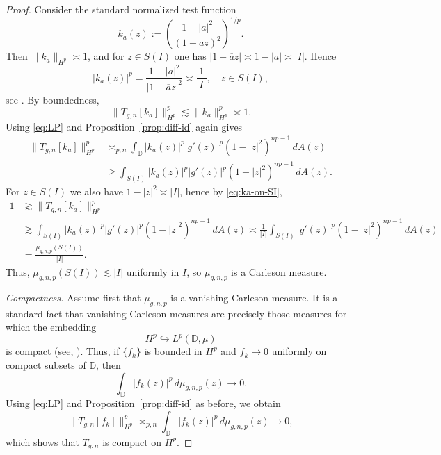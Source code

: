 \documentclass[preprint,12pt]{elsarticle}
\numberwithin{equation}{section}
\theoremstyle{remark}
\begin{document}
\begin{proof}
Consider the standard normalized test function
\begin{equation*}
k_a(z):=\left(\frac{1-|a|^2}{(1-\overline a z)^2}\right)^{1/p}.
\end{equation*}
Then $\|k_a\|_{H^p}\asymp 1$, and for $z\in S(I)$ one has $|1-\overline a z|\asymp 1-|a|\asymp |I|$. Hence
\begin{equation}\label{eq:ka-on-SI}
|k_a(z)|^p=\frac{1-|a|^2}{|1-\overline a z|^2}\asymp \frac{1}{|I|}, \quad z\in S(I),
\end{equation}
see \cite[Ch.~2]{Garnett-book}. By boundedness,
\begin{equation*}
\|T_{g,n}[k_a]\|_{H^p}^p\lesssim \|k_a\|_{H^p}^p\asymp 1.
\end{equation*}
Using \eqref{eq:LP} and Proposition~\ref{prop:diff-id} again gives
\begin{align*}
\|T_{g,n}[k_a]\|_{H^p}^p
&\asymp_{p,n}
\int_{\mathbb D}|k_a(z)|^p |g'(z)|^p (1-|z|^2)^{np-1}\,dA(z)\\
&\ge
\int_{S(I)}|k_a(z)|^p |g'(z)|^p (1-|z|^2)^{np-1}\,dA(z).
\end{align*}
For $z\in S(I)$ we also have $1-|z|^2\asymp |I|$, hence by \eqref{eq:ka-on-SI},
\begin{align*}
1
&\gtrsim \|T_{g,n}[k_a]\|_{H^p}^p\\
&\gtrsim
\int_{S(I)} |k_a(z)|^p |g'(z)|^p (1-|z|^2)^{np-1}\,dA(z)
\asymp
\frac{1}{|I|}\int_{S(I)} |g'(z)|^p (1-|z|^2)^{np-1}\,dA(z)\\
&=
\frac{\mu_{g,n,p}(S(I))}{|I|}.
\end{align*}
Thus, $\mu_{g,n,p}(S(I))\lesssim |I|$ uniformly in $I$, so $\mu_{g,n,p}$ is a Carleson measure.

\medskip
\noindent\textit{Compactness.}
Assume first that $\mu_{g,n,p}$ is a vanishing Carleson measure. It is a standard fact that
vanishing Carleson measures are precisely those measures for which the embedding
\begin{equation*}
H^p \hookrightarrow L^p(\mathbb D,\mu)
\end{equation*}
is compact (see, \cite[Ch.~3]{Garnett-book}).
Thus, if $\{f_k\}$ is bounded in $H^p$ and $f_k\to 0$ uniformly on compact subsets of $\mathbb D$, then
\begin{equation}\label{eq:compact-embed}
\int_{\mathbb D} |f_k(z)|^p\,d\mu_{g,n,p}(z)\longrightarrow 0.
\end{equation}
Using \eqref{eq:LP} and Proposition~\ref{prop:diff-id} as before, we obtain
\begin{equation*}
\|T_{g,n}[f_k]\|_{H^p}^p
\asymp_{p,n}
\int_{\mathbb D} |f_k(z)|^p\,d\mu_{g,n,p}(z)\longrightarrow 0,
\end{equation*}
which shows that $T_{g,n}$ is compact on $H^p$.


\end{proof}
\end{document}
